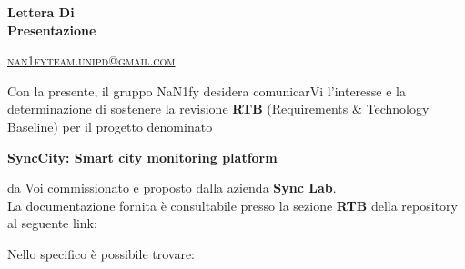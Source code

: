 \documentclass[8pt]{article}
\begin{document}
\begin{titlepage}
\begin{minipage}[t]{0.47\textwidth}
{		}
		\vspace{4mm}\vspace{4mm}
	\end{minipage}
	\vspace{4cm}
	\begin{center}
		\begin{flushright}
			{\fontsize{30pt}{52pt}\selectfont \textbf{Lettera Di \\Presentazione\\}} %
		\end{flushright}
		\vspace{3cm}
	\end{center}
	\vspace{8.5 cm}
	{\small \textsc{\href{mailto: nan1fyteam.unipd@gmail.com}{nan1fyteam.unipd@gmail.com}}}
\end{titlepage}
\pagestyle{mystyle}
\newpage
Con la presente, il gruppo NaN1fy desidera comunicarVi l'interesse e la determinazione di sostenere
la revisione \textbf{RTB} (Requirements \& Technology Baseline) per il
progetto denominato\\
\begin{center}
	\textbf{SyncCity: Smart city monitoring platform}
\end{center}
da Voi commissionato e proposto dalla azienda \textbf{Sync Lab}.
\vspace{1em}
\\La documentazione fornita è consultabile presso la sezione \textbf{RTB} della repository al seguente link:
\begin{center}
	\textbf{\href{https://github.com/NaN1fy/docs/tree/main/documents/RTB}{\color{myblue}{https://github.com/NaN1fy/docs/tree/main/documents/RTB}}}
\end{center}
Nello specifico è possibile trovare:
\end{document}

